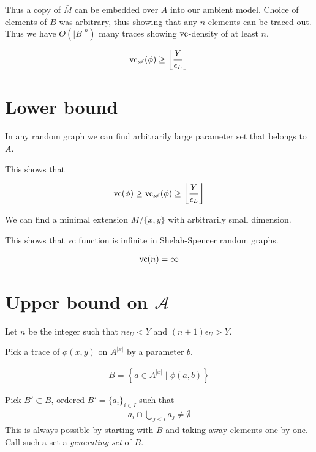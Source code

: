 \documentclass{amsart}
\renewcommand{\AA}{\mathscr A}
\newcommand{\curly}[1]{\left\{#1\right\}}
\providecommand{\floor}[1]{\left \lfloor #1 \right \rfloor }
\begin{document}
Thus a copy of $\bar M$ can be embedded over $A$ into our ambient model.
Choice of elements of $B$ was arbitrary, thus showing that any $n$ elements can be traced out.
Thus we have $O(|B|^n)$ many traces showing $\operatorname{vc}$-density of at least $n$.

\begin{align*}
	\vc_\AA(\phi) \geq \floor{\frac{Y}{\epsilon_L}}
\end{align*}

\section*{Lower bound}

\begin{Claim}
	In any random graph we can find arbitrarily large parameter set that belongs to $A$.
\end{Claim}

This shows that

\begin{align*}
	\vc(\phi) \geq \vc_\AA(\phi) \geq \floor{\frac{Y}{\epsilon_L}}
\end{align*}

\begin{Claim}
	We can find a minimal extension $M / \{x, y\}$ with arbitrarily small dimension.
\end{Claim}

This shows that vc function is infinite in Shelah-Spencer random graphs.

\begin{align*}
	\operatorname{vc}(n) = \infty
\end{align*}

\section*{Upper bound on $\AA$}

Let $n$ be the integer such that $n \epsilon_U < Y$ and $(n+1) \epsilon_U > Y$.

Pick a trace of $\phi(x,y)$ on $A^{|x|}$ by a parameter $b$.

\begin{align*}
	B = \curly{a \in A^{|x|} \mid \phi(a, b)}
\end{align*}

Pick $B' \subset B$, ordered $B' = \{a_i\}_{i \in I}$ such that
\begin{align*}
	a_i \cap \bigcup_{j < i} a_j \neq \emptyset
\end{align*}
This is always possible by starting with $B$ and taking away elements one by one.
Call such a set a \emph{generating set} of $B$.
\end{document}
